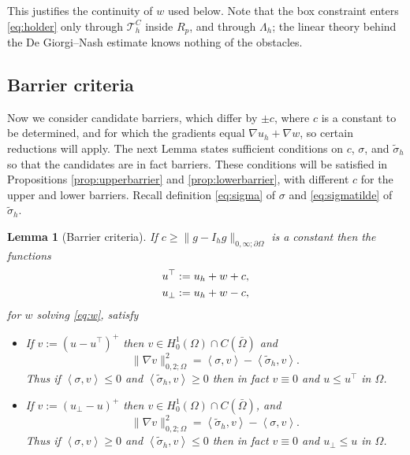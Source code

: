\documentclass[12pt]{amsart}
\numberwithin{equation}{section}
\theoremstyle{plain}
\newtheorem{lemma}[theorem]{Lemma}
\theoremstyle{definition}
\theoremstyle{remark}
\newcommand{\Om}{\Omega}
\newcommand{\dOm}{\partial\Omega}
\newcommand{\Th}{\mathcal{T}_h}
\newcommand{\Ih}{I_h}
\newcommand{\ThC}{\Th^C}
\newcommand{\Lamh}{\Lambda_h}
\begin{document}
This justifies the continuity of $w$ used below.  Note that the box constraint enters \eqref{eq:holder} only through $\ThC$ inside $R_p$, and through $\Lamh$; the linear theory behind the De Giorgi--Nash estimate knows nothing of the obstacles.

\subsection{Barrier criteria}  Now we consider candidate barriers, which differ by $\pm c$, where $c$ is a constant to be determined, and for which the gradients equal $\nabla u_h + \nabla w$, so certain reductions will apply.  The next Lemma states sufficient conditions on $c$, $\sigma$, and $\tilde\sigma_h$ so that the candidates are in fact barriers.  These conditions will be satisfied in Propositions \ref{prop:upperbarrier} and \ref{prop:lowerbarrier}, with different $c$ for the upper and lower barriers.  Recall definition \eqref{eq:sigma} of $\sigma$ and \eqref{eq:sigmatilde} of $\tilde\sigma_h$.

\begin{lemma}[Barrier criteria]
\label{lem:barriercrit}
If $c \ge \|g - \Ih g\|_{0,\infty;\dOm}$ is a constant then the functions
\begin{align}
u^\top &:= u_h + w + c, \label{eq:candc} \\
u_\bot &:= u_h + w - c, \notag
\end{align}
for $w$ solving \eqref{eq:w}, satisfy
\begin{itemize}
\item[(a)] If $v := (u - u^\top)^+$ then $v \in H_0^1(\Om) \cap C(\bar\Om)$ and
\begin{equation}
\label{eq:barrierenergy}
  \|\nabla v\|_{0,2;\Om}^2 = \left<\sigma,v\right> - \left<\tilde\sigma_h,v\right>.
\end{equation}
Thus if $\left<\sigma,v\right> \le 0$ and $\left<\tilde\sigma_h,v\right> \ge 0$ then in fact $v\equiv 0$ and $u \le u^\top$ in $\Om$.
\item[(b)] If $v := (u_\bot - u)^+$ then $v \in H_0^1(\Om) \cap C(\bar\Om)$, and
\begin{equation}
\|\nabla v\|_{0,2;\Om}^2 = \left<\tilde\sigma_h,v\right> - \left<\sigma,v\right>.
\end{equation}
Thus if $\left<\sigma,v\right> \ge 0$ and $\left<\tilde\sigma_h,v\right> \le 0$ then in fact $v\equiv 0$ and $u_\bot \le u$ in $\Om$.
\end{itemize}
\end{lemma}
\end{document}
